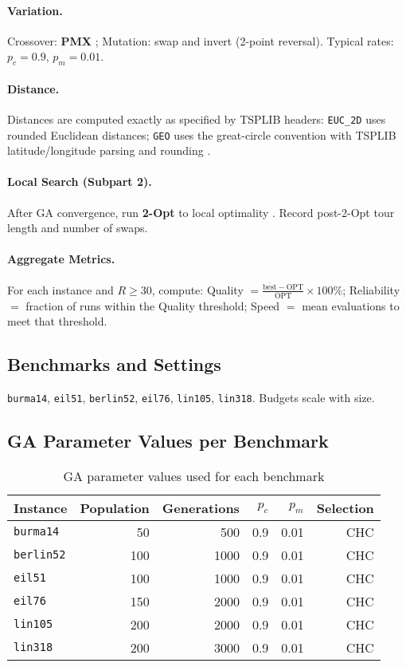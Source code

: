 \documentclass{article}
\begin{document}
\paragraph{Variation.} Crossover: \textbf{PMX} \cite{goldberg1985pmx}; Mutation: swap and invert (2-point reversal). Typical rates: $p_c{=}0.9$, $p_m{=}0.01$.
\paragraph{Distance.} Distances are computed exactly as specified by TSPLIB headers: \texttt{EUC\_2D} uses rounded Euclidean distances; \texttt{GEO} uses the great-circle convention with TSPLIB latitude/longitude parsing and rounding \cite{reinelt1991tsplib}.
\paragraph{Local Search (Subpart 2).} After GA convergence, run \textbf{2-Opt} to local optimality \cite{lin1973lk}. Record post-2-Opt tour length and number of swaps.
\paragraph{Aggregate Metrics.} For each instance and $R\ge 30$, compute:
Quality $=\frac{\overline{\text{best}}-\text{OPT}}{\text{OPT}}\times100\%$;
Reliability $=$ fraction of runs within the Quality threshold;
Speed $=$ mean evaluations to meet that threshold.

\subsection{Benchmarks and Settings}
\texttt{burma14}, \texttt{eil51}, \texttt{berlin52}, \texttt{eil76}, \texttt{lin105}, \texttt{lin318}. Budgets scale with size.

\subsection{GA Parameter Values per Benchmark}
\begin{table}[H]
\centering
\caption{GA parameter values used for each benchmark}
\begin{tabular}{lrrrrr}
\toprule
Instance & Population & Generations & $p_c$ & $p_m$ & Selection \\
\midrule
\texttt{burma14} & 50 & 500 & 0.9 & 0.01 & CHC \\
\texttt{berlin52} & 100 & 1000 & 0.9 & 0.01 & CHC \\
\texttt{eil51} & 100 & 1000 & 0.9 & 0.01 & CHC \\
\texttt{eil76} & 150 & 2000 & 0.9 & 0.01 & CHC \\
\texttt{lin105} & 200 & 2000 & 0.9 & 0.01 & CHC \\
\texttt{lin318} & 200 & 3000 & 0.9 & 0.01 & CHC \\
\bottomrule
\end{tabular}
\end{table}
\end{document}
